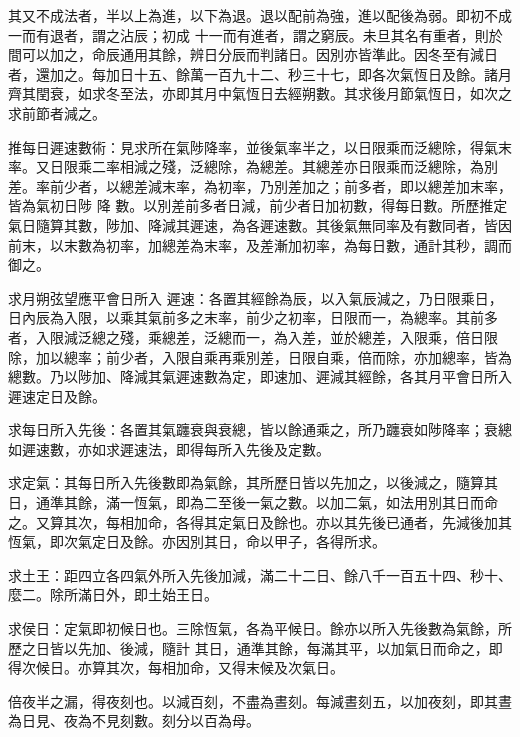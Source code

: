 \begin{pinyinscope}
 其又不成法者，半以上為進，以下為退。退以配前為強，進以配後為弱。即初不成一而有退者，謂之沾辰；初成
 十一而有進者，謂之窮辰。未旦其名有重者，則於間可以加之，命辰通用其餘，辨日分辰而判諸日。因別亦皆準此。因冬至有減日者，還加之。每加日十五、餘萬一百九十二、秒三十七，即各次氣恆日及餘。諸月齊其閏衰，如求冬至法，亦即其月中氣恆日去經朔數。其求後月節氣恆日，如次之求前節者減之。



 推每日遲速數術：見求所在氣陟降率，並後氣率半之，以日限乘而泛總除，得氣末率。又日限乘二率相減之殘，泛總除，為總差。其總差亦日限乘而泛總除，為別差。率前少者，以總差減末率，為初率，乃別差加之；前多者，即以總差加末率，皆為氣初日陟
 降
 數。以別差前多者日減，前少者日加初數，得每日數。所歷推定氣日隨算其數，陟加、降減其遲速，為各遲速數。其後氣無同率及有數同者，皆因前末，以末數為初率，加總差為末率，及差漸加初率，為每日數，通計其秒，調而御之。



 求月朔弦望應平會日所入
 遲速：各置其經餘為辰，以入氣辰減之，乃日限乘日，日內辰為入限，以乘其氣前多之末率，前少之初率，日限而一，為總率。其前多者，入限減泛總之殘，乘總差，泛總而一，為入差，並於總差，入限乘，倍日限除，加以總率；前少者，入限自乘再乘別差，日限自乘，倍而除，亦加總率，皆為總數。乃以陟加、降減其氣遲速數為定，即速加、遲減其經餘，各其月平會日所入遲速定日及餘。



 求每日所入先後：各置其氣躔衰與衰總，皆以餘通乘之，所乃躔衰如陟降率；衰總如遲速數，亦如求遲速法，即得每所入先後及定數。



 求定氣：其每日所入先後數即為氣餘，其所歷日皆以先加之，以後減之，隨算其日，通準其餘，滿一恆氣，即為二至後一氣之數。以加二氣，如法用別其日而命之。又算其次，每相加命，各得其定氣日及餘也。亦以其先後已通者，先減後加其恆氣，即次氣定日及餘。亦因別其日，命以甲子，各得所求。



 求土王：距四立各四氣外所入先後加減，滿二十二日、餘八千一百五十四、秒十、麼二。除所滿日外，即土始王日。



 求侯日：定氣即初候日也。三除恆氣，各為平候日。餘亦以所入先後數為氣餘，所歷之日皆以先加、後減，隨計
 其日，通準其餘，每滿其平，以加氣日而命之，即得次候日。亦算其次，每相加命，又得末候及次氣日。



 倍夜半之漏，得夜刻也。以減百刻，不盡為晝刻。每減晝刻五，以加夜刻，即其晝為日見、夜為不見刻數。刻分以百為母。




\end{pinyinscope}
